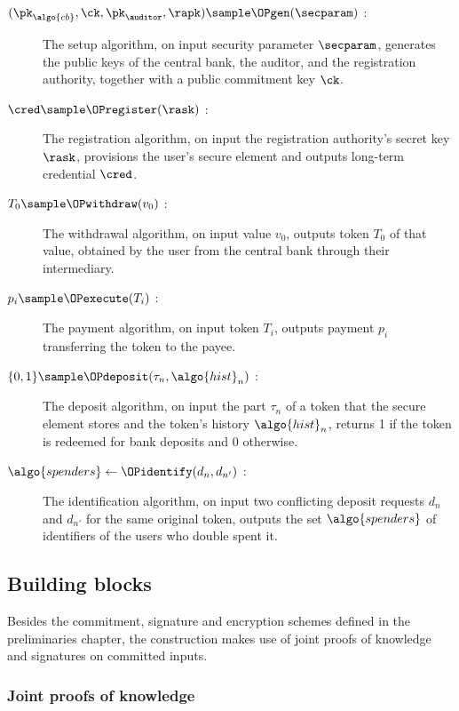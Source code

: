 \begin{description}

  \item[$(\pk_{\algo{cb}}, \ck, \pk_\auditor, \rapk) \sample
\OPgen(\secparam)$ :] The setup algorithm, on input security parameter
$\secparam$, generates the public keys of the central bank, the auditor, and the
registration authority, together with a public commitment key $\ck$.

  \item[$\cred \sample \OPregister(\rask)$ :] The registration algorithm, on
input the registration authority's secret key $\rask$, provisions the user's
secure element and outputs long-term credential $\cred$.

  \item[$T_0 \sample \OPwithdraw(v_0)$ :] The withdrawal algorithm, on input
value $v_0$, outputs token $T_0$ of that value, obtained by the user from the
central bank through their intermediary.

  \item[$p_i \sample \OPexecute(T_i)$ :] The payment algorithm, on input token
$T_i$, outputs payment $p_i$ transferring the token to the payee.

  \item[$\{0,1\} \sample \OPdeposit(\tau_n, \algo{hist}_n)$ :] The deposit
algorithm, on input the part $\tau_n$ of a token that the secure element stores
and the token's history $\algo{hist}_n$, returns 1 if
the token is redeemed for bank deposits and 0 otherwise.

  \item[$\algo{spenders} \leftarrow \OPidentify(d_n, d_{n'})$ :] The identification
algorithm, on input two conflicting deposit requests $d_n$ and $d_{n'}$ for the
same original token, outputs the set $\algo{spenders}$ of identifiers of the users who
double spent it.

\end{description}

\subsection{Building blocks}\label{sec:offline-building-blocks}

Besides the commitment, signature and encryption schemes defined in the
preliminaries chapter, the construction makes use of joint proofs of knowledge
and signatures on committed inputs.

\subsubsection*{Joint proofs of knowledge}

